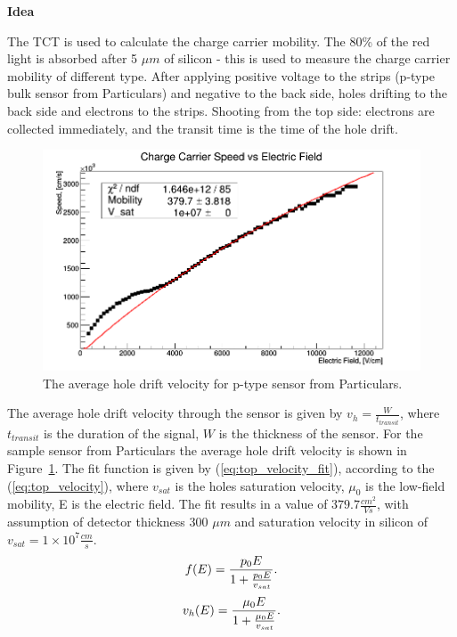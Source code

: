 \documentclass[12pt,oneside,notitlepage,abstracton,a4paper]{scrartcl}
\begin{document}
\textbf{Idea}

\indent The TCT is used to calculate the charge carrier mobility. The 80\% of the red light is absorbed after 5 $\mu m$ of silicon\cite{bib:opt_si} - this is used to measure the charge carrier mobility of different type. After applying positive voltage to the strips (p-type bulk sensor from Particulars) and negative to the back side, holes drifting to the back side and electrons to the strips. Shooting from the top side: electrons are collected immediately, and the transit time is the time of the hole drift. 

\begin{figure}[H]
    \centering
    \includegraphics[width=14cm]{pics/top_velocity}
    \caption{The average hole drift velocity for p-type sensor from Particulars.}
    \label{fig:top_velocity}
\end{figure}

The average hole drift velocity through the sensor is given by $v_h = \frac{W}{t_{transit}}$, where $t_{transit}$ is the duration of the signal, $W$ is the thickness of the sensor. For the sample sensor from Particulars the average hole drift velocity is shown in Figure~\ref{fig:top_velocity}. The fit function is given by (\ref{eq:top_velocity_fit}), according to the (\ref{eq:top_velocity}), where $v_{sat}$ is the holes saturation velocity, $\mu_0$ is the low-field mobility, E is the electric field. The fit results in a value of $379.7 \frac{cm^2}{V s}$, with assumption of detector thickness 300 $\mu m$ and saturation velocity in silicon of $v_{sat}=1 \times 10^7 \frac{cm}{s}$.
\begin{equation}
    \centering
    f(E) = \frac{p_0 E}{1+\frac{p_0 E}{v_{sat}}}.
    \label{eq:top_velocity_fit}
\end{equation}
\begin{equation}
    \centering
    v_h(E) = \frac{\mu_0 E}{1+\frac{\mu_0 E}{v_{sat}}}.
    \label{eq:top_velocity}
\end{equation}
\end{document}
